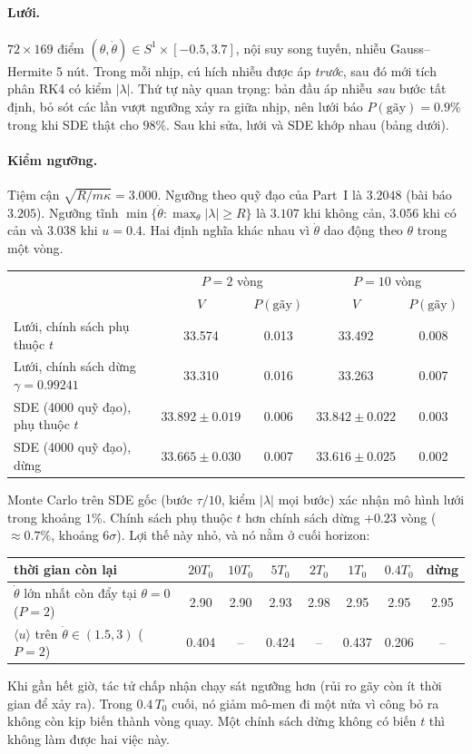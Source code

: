 \documentclass[11pt,a4paper]{article}
\theoremstyle{remark}
\begin{document}
\paragraph{Lưới.} $72\times169$ điểm $(\theta,\dot\theta)\in S^1\times[-0.5,3.7]$, nội suy song tuyến, nhiễu Gauss--Hermite 5 nút. Trong mỗi nhịp, cú hích nhiễu được áp \emph{trước}, sau đó mới tích phân RK4 có kiểm $|\lambda|$. Thứ tự này quan trọng: bản đầu áp nhiễu \emph{sau} bước tất định, bỏ sót các lần vượt ngưỡng xảy ra giữa nhịp, nên lưới báo $P(\text{gãy})=0.9\%$ trong khi SDE thật cho $98\%$. Sau khi sửa, lưới và SDE khớp nhau (bảng dưới).

\paragraph{Kiểm ngưỡng.} Tiệm cận $\sqrt{R/m\kappa}=3.000$. Ngưỡng theo quỹ đạo của Part~I là $3.2048$ (bài báo $3.205$). Ngưỡng tĩnh $\min\{\dot\theta:\max_\theta|\lambda|\ge R\}$ là $3.107$ khi không cản, $3.056$ khi có cản và $3.038$ khi $u=0.4$. Hai định nghĩa khác nhau vì $\dot\theta$ dao động theo $\theta$ trong một vòng.

\begin{center}
\begin{tabular}{lcccc}
\toprule
 & \multicolumn{2}{c}{$P=2$ vòng} & \multicolumn{2}{c}{$P=10$ vòng}\\
 & $V$ & $P(\text{gãy})$ & $V$ & $P(\text{gãy})$\\
\midrule
Lưới, chính sách phụ thuộc $t$ & 33.574 & 0.013 & 33.492 & 0.008\\
Lưới, chính sách dừng $\gamma=0.99241$ & 33.310 & 0.016 & 33.263 & 0.007\\
SDE (4000 quỹ đạo), phụ thuộc $t$ & $33.892\pm0.019$ & 0.006 & $33.842\pm0.022$ & 0.003\\
SDE (4000 quỹ đạo), dừng & $33.665\pm0.030$ & 0.007 & $33.616\pm0.025$ & 0.002\\
\bottomrule
\end{tabular}
\end{center}
Monte Carlo trên SDE gốc (bước $\tau/10$, kiểm $|\lambda|$ mọi bước) xác nhận mô hình lưới trong khoảng $1\%$. Chính sách phụ thuộc $t$ hơn chính sách dừng $+0.23$ vòng ($\approx0.7\%$, khoảng $6\sigma$). Lợi thế này nhỏ, và nó nằm ở cuối horizon:

\begin{center}
\begin{tabular}{lcccccc|c}
\toprule
thời gian còn lại & $20T_0$ & $10T_0$ & $5T_0$ & $2T_0$ & $1T_0$ & $0.4T_0$ & dừng\\
\midrule
$\dot\theta$ lớn nhất còn đẩy tại $\theta=0$ ($P=2$) & 2.90 & 2.90 & 2.93 & 2.98 & 2.95 & 2.95 & 2.95\\
$\langle u\rangle$ trên $\dot\theta\in(1.5,3)$ ($P=2$) & 0.404 & -- & 0.424 & -- & 0.437 & 0.206 & --\\
\bottomrule
\end{tabular}
\end{center}
Khi gần hết giờ, tác tử chấp nhận chạy sát ngưỡng hơn (rủi ro gãy còn ít thời gian để xảy ra). Trong $0.4\,T_0$ cuối, nó giảm mô-men đi một nửa vì công bỏ ra không còn kịp biến thành vòng quay. Một chính sách dừng không có biến $t$ thì không làm được hai việc này.
\end{document}
